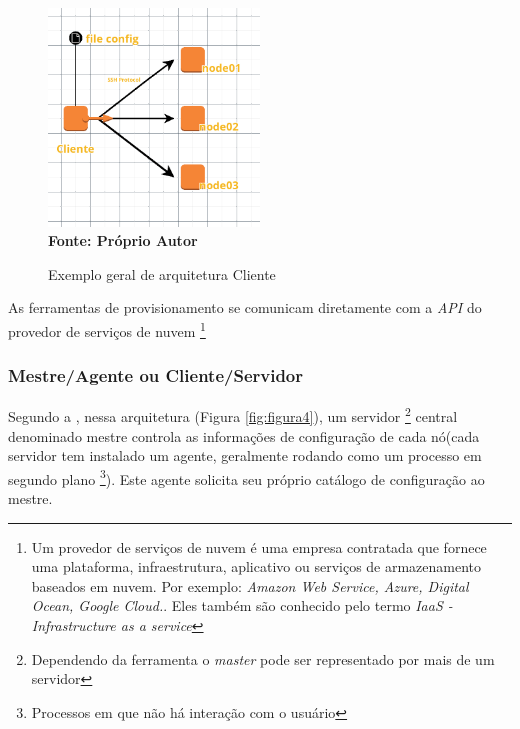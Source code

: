 \begin{figure}[ht]
	\centering	
	\caption[\hspace{0.1cm}Exemplo arquitetura Cliente]{Exemplo geral de arquitetura Cliente}
	\vspace{-0.4cm}
	\includegraphics[width=0.5\textwidth]{figuras/cliente.png}
	 \vspace{-0.2cm}
	\\\textbf{\footnotesize Fonte: Próprio Autor}
	\label{fig:figura3}
\end{figure}
\vspace{-0.5cm}


As ferramentas de provisionamento se comunicam diretamente com a \textit{API} do provedor de serviços de nuvem \footnote{Um provedor de serviços de nuvem é uma empresa contratada que fornece uma plataforma, infraestrutura, aplicativo ou serviços de armazenamento baseados em nuvem. Por exemplo: \textit{Amazon Web Service, Azure, Digital Ocean, Google Cloud.}. Eles também são conhecido pelo termo \textit{IaaS - Infrastructure as a service} }


\subsubsection{Mestre/Agente ou Cliente/Servidor} \label{cliente-servidor}
 
 Segundo a , nessa arquitetura (Figura \ref{fig:figura4}), um servidor \footnote{Dependendo da ferramenta o \textit{master} pode ser representado por mais de um servidor} central denominado mestre controla as informações de configuração de cada nó(cada servidor tem instalado  um agente, geralmente rodando como um processo em segundo plano \footnote{Processos em que não há interação com o usuário}). Este agente solicita seu próprio catálogo de configuração ao mestre.  
 

